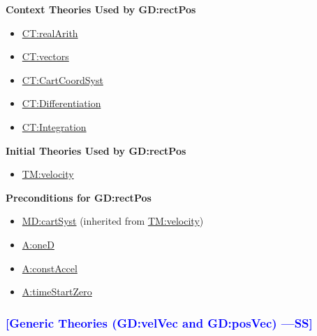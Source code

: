 \documentclass[12pt]{article}
\newcommand{\authornote}[3]{\textcolor{#1}{[#3 ---#2]}}
\newcommand{\authornote}[3]{}
\newcommand{\wss}[1]{\authornote{blue}{SS}{#1}}
\begin{document}
\noindent \textbf{Context Theories Used by GD:rectPos}

\begin{itemize}
\item \hyperref[CT:realArith]{CT:realArith}
\item \hyperref[CT:vectors]{CT:vectors}
\item \hyperref[CT:CartCoordSyst]{CT:CartCoordSyst}
\item \hyperref[CT:Differentiation]{CT:Differentiation}
\item \hyperref[CT:Integration]{CT:Integration}
\end{itemize}

\noindent \textbf{Initial Theories Used by GD:rectPos}

\begin{itemize}
\item \hyperref[TM:velocity]{TM:velocity}
\end{itemize}

\noindent \textbf{Preconditions for GD:rectPos}

\begin{itemize}
\item \hyperref[MD:cartSyst]{MD:cartSyst} (inherited from \hyperref[TM:velocity]{TM:velocity})
\item \hyperref[oneD]{A:oneD}
\item \hyperref[constAccel]{A:constAccel}
\item \hyperref[timeStartZero]{A:timeStartZero}
\end{itemize}

\subsubsection{\wss{Generic Theories (GD:velVec and GD:posVec)}}
\end{document}
